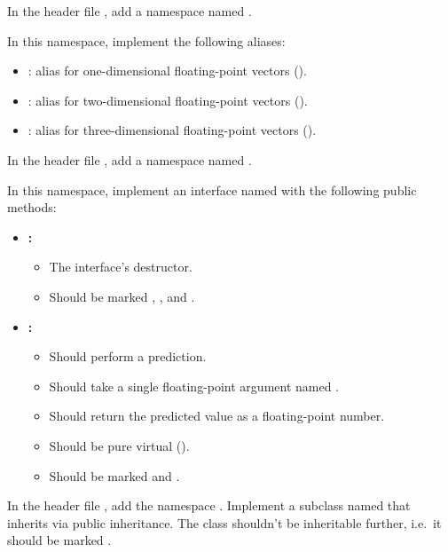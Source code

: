 \label{c1:ex:5}
In the header file , add a namespace named .

In this namespace, implement the following aliases:
\begin{itemize}
  \item {}: alias for one-dimensional floating-point vectors
    ().
  \item {}: alias for two-dimensional floating-point vectors
    ().
  \item {}: alias for three-dimensional floating-point vectors
    ().
\end{itemize}

\label{c1:ex:6}
In the header file , add a namespace named .

In this namespace, implement an interface named  with the following public
methods:
\begin{itemize}
  \item \textbf{:}
  \begin{itemize}
    \item The interface's destructor.
    \item Should be marked , , and .
  \end{itemize}
  \item \textbf{:}
  \begin{itemize}
    \item Should perform a prediction.
    \item Should take a single floating-point argument named .
    \item Should return the predicted value as a floating-point number.
    \item Should be pure virtual ().
    \item Should be marked  and .
  \end{itemize}
\end{itemize}

\label{c1:ex:7}
In the header file , add the namespace . Implement a
subclass named  that inherits  via public inheritance. The class
shouldn't be inheritable further, i.e.\ it should be marked .

